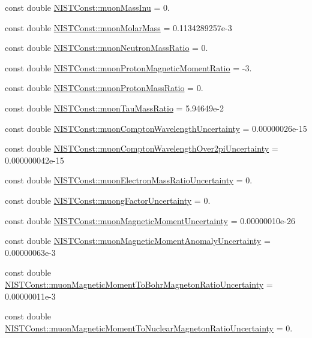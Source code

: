 \begin{DoxyCompactItemize}
\item 
const double \hyperlink{group___muon_gaa24722892f878b56a8aa97cca27ed908}{N\+I\+S\+T\+Const\+::muon\+Mass\+Inu} = 0.
\item 
const double \hyperlink{group___muon_ga9211251167ca5318354df60b44939e60}{N\+I\+S\+T\+Const\+::muon\+Molar\+Mass} = 0.\+1134289257e-\/3
\item 
const double \hyperlink{group___muon_ga8f63813d3e0283a611f3e66b6d0b681d}{N\+I\+S\+T\+Const\+::muon\+Neutron\+Mass\+Ratio} = 0.
\item 
const double \hyperlink{group___muon_gae49d53271e3ee71dc74d718028782d06}{N\+I\+S\+T\+Const\+::muon\+Proton\+Magnetic\+Moment\+Ratio} = -\/3.
\item 
const double \hyperlink{group___muon_ga72ca5408215ae40bb36ef1bff9107cf7}{N\+I\+S\+T\+Const\+::muon\+Proton\+Mass\+Ratio} = 0.
\item 
const double \hyperlink{group___muon_gaaf24aa0c43f6d4a1935963fdd4c44789}{N\+I\+S\+T\+Const\+::muon\+Tau\+Mass\+Ratio} = 5.\+94649e-\/2
\item 
const double \hyperlink{group___muon_gae48b3636db6004dfce70688e14d5ec59}{N\+I\+S\+T\+Const\+::muon\+Compton\+Wavelength\+Uncertainty} = 0.\+00000026e-\/15
\item 
const double \hyperlink{group___muon_ga7327c823c40a8b0d6f6f5ecfbdb52b68}{N\+I\+S\+T\+Const\+::muon\+Compton\+Wavelength\+Over2pi\+Uncertainty} = 0.\+000000042e-\/15
\item 
const double \hyperlink{group___muon_gaa73904af881586f3175bff51bcb130ff}{N\+I\+S\+T\+Const\+::muon\+Electron\+Mass\+Ratio\+Uncertainty} = 0.
\item 
const double \hyperlink{group___muon_gaf7efb5afb4641fedbcf2e7d0842eb301}{N\+I\+S\+T\+Const\+::muong\+Factor\+Uncertainty} = 0.
\item 
const double \hyperlink{group___muon_ga1adea83a61f7ae21631c916328f5dd52}{N\+I\+S\+T\+Const\+::muon\+Magnetic\+Moment\+Uncertainty} = 0.\+00000010e-\/26
\item 
const double \hyperlink{group___muon_ga91c2a0c6a14a87fb189ce001120b5eb0}{N\+I\+S\+T\+Const\+::muon\+Magnetic\+Moment\+Anomaly\+Uncertainty} = 0.\+00000063e-\/3
\item 
const double \hyperlink{group___muon_gacdeb845bce82c4adb3abba35a9cb5169}{N\+I\+S\+T\+Const\+::muon\+Magnetic\+Moment\+To\+Bohr\+Magneton\+Ratio\+Uncertainty} = 0.\+00000011e-\/3
\item 
const double \hyperlink{group___muon_gaae88c6b42b479868be61ac4bcc1a0492}{N\+I\+S\+T\+Const\+::muon\+Magnetic\+Moment\+To\+Nuclear\+Magneton\+Ratio\+Uncertainty} = 0.

\end{DoxyCompactItemize}
